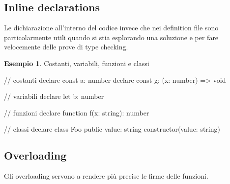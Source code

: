 \documentclass[12pt]{article}
\theoremstyle{definition}
\newtheorem{example}{Esempio}[subsection]
\newenvironment{code}
  {\vspace{0.5cm} \VerbatimEnvironment\begin{typescriptcode}}
  {\end{typescriptcode} \vspace{0.2cm}}
\begin{document}
\subsection{Inline declarations}

Le dichiarazione all'interno del codice invece che nei definition file sono particolarmente utili quando si stia esplorando
una soluzione e per fare velocemente delle prove di type checking.

\begin{example}
Costanti, variabili, funzioni e classi

\begin{code}
// costanti
declare const a: number
declare const g: (x: number) => void

// variabili
declare let b: number

// funzioni
declare function f(x: string): number

// classi
declare class Foo {
  public value: string
  constructor(value: string)
}
\end{code}
\end{example}

\subsection{Overloading}

Gli overloading servono a rendere più precise le firme delle funzioni.
\end{document}
